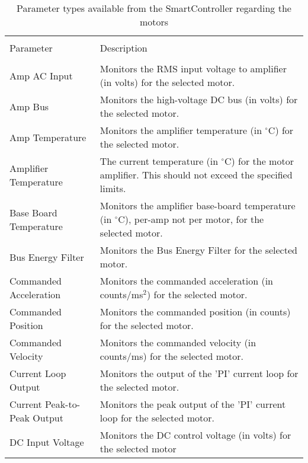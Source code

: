 \begin{longtable}[width=\textwidth]{ p{} | p{}}
\caption[Parameter types available from the SmartController regarding the motors]{Parameter types available from the SmartController regarding the motors} \vspace{0.3cm}
\label{tab:Motor Data Types} \\
Parameter & Description \\ [1ex]
\hline \\
\parbox[t]{0.33\textwidth}{Amp AC Input} & Monitors the RMS input voltage to amplifier (in volts) for the selected motor.\\ [2ex]
\parbox[t]{0.33\textwidth}{Amp Bus} & Monitors the high-voltage DC bus (in volts) for the selected motor.\\ [2ex]
\parbox[t]{0.33\textwidth}{Amp Temperature} & Monitors the amplifier temperature (in $^\circ$C) for the selected motor.\\ [2ex]
\parbox[t]{0.33\textwidth}{Amplifier Temperature} & The current temperature (in $^\circ$C) for the motor amplifier. This should not exceed the specified limits. \\ [2ex]
\parbox[t]{0.33\textwidth}{Base Board Temperature} & Monitors the amplifier base-board temperature (in $^\circ$C), per-amp not per motor, for the selected motor.\\ [2ex]
\parbox[t]{0.33\textwidth}{Bus Energy Filter} & Monitors the Bus Energy Filter for the selected motor.\\ [2ex]
\parbox[t]{0.33\textwidth}{Commanded Acceleration} & Monitors the commanded acceleration (in counts/ms$^2$) for the selected motor.\\ [2ex]
\parbox[t]{0.33\textwidth}{Commanded Position} & Monitors the commanded position (in counts) for the selected motor. \\ [2ex]
\parbox[t]{0.33\textwidth}{Commanded Velocity} & Monitors the commanded velocity (in counts/ms) for the selected motor.\\ [2ex]
\parbox[t]{0.33\textwidth}{Current Loop Output} & Monitors the output of the 'PI' current loop for the selected motor.\\ [2ex]
\parbox[t]{0.33\textwidth}{Current Peak-to-Peak Output} & Monitors the peak output of the 'PI' current loop for the selected motor.\\ [2ex]
\parbox[t]{0.33\textwidth}{DC Input Voltage} & Monitors the DC control voltage (in volts) for the selected motor\\ [2ex]

\end{longtable}
